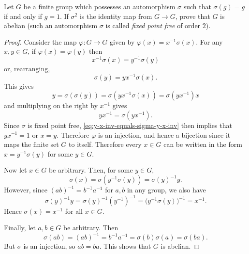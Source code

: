  Let $G$ be a finite group which possesses an
automorphism $\sigma$ such that $\sigma(g) = g$ if and only if
$g = 1$. If $\sigma^2$ is the identity map from $G\to G$, prove that
$G$ is abelian (such an automorphism $\sigma$ is called {\em fixed
  point free} of order $2$).
\begin{proof}
  Consider the map $\varphi\colon G\to G$ given by
  $\varphi(x) = x^{-1}\sigma(x)$. For any $x,y\in G$, if
  $\varphi(x) = \varphi(y)$ then
  \begin{equation*}
    x^{-1}\sigma(x) = y^{-1}\sigma(y)
  \end{equation*}
  or, rearranging,
  \begin{equation*}
    \sigma(y) = yx^{-1}\sigma(x).
  \end{equation*}
  This gives
  \begin{equation*}
    y = \sigma(\sigma(y)) = \sigma(yx^{-1}\sigma(x))
    = \sigma(yx^{-1})x
  \end{equation*}
  and multiplying on the right by $x^{-1}$ gives
  \begin{equation}
    \label{eq:y-x-inv-equals-sigma-y-x-inv}
    yx^{-1} = \sigma(yx^{-1}).
  \end{equation}
  Since $\sigma$ is fixed point free,
  \eqref{eq:y-x-inv-equals-sigma-y-x-inv} then implies that
  $yx^{-1} = 1$ or $x = y$. Therefore $\varphi$ is an injection, and
  hence a bijection since it maps the finite set $G$ to
  itself. Therefore every $x\in G$ can be written in the form
  $x = y^{-1}\sigma(y)$ for some $y\in G$.

  Now let $x\in G$ be arbitrary. Then, for some $y\in G$,
  \begin{equation*}
    \sigma(x) = \sigma(y^{-1}\sigma(y)) = \sigma(y)^{-1}y.
  \end{equation*}
  However, since $(ab)^{-1} = b^{-1}a^{-1}$ for $a,b$ in any group, we
  also have
  \begin{equation*}
    \sigma(y)^{-1}y = \sigma(y)^{-1}(y^{-1})^{-1}
    = \big(y^{-1}\sigma(y)\big)^{-1} = x^{-1}.
  \end{equation*}
  Hence $\sigma(x) = x^{-1}$ for all $x\in G$.

  Finally, let $a,b\in G$ be arbitrary. Then
  \begin{equation*}
    \sigma(ab) = (ab)^{-1} = b^{-1}a^{-1} = \sigma(b)\sigma(a) = \sigma(ba).
  \end{equation*}
  But $\sigma$ is an injection, so $ab = ba$. This shows that $G$ is
  abelian.
\end{proof}

